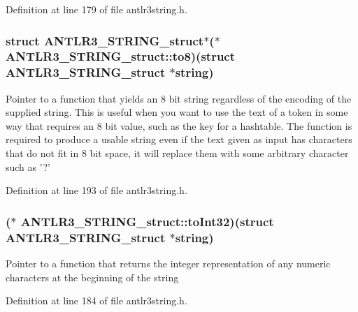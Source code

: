 Definition at line 179 of file antlr3string.\-h.

\hypertarget{struct_a_n_t_l_r3___s_t_r_i_n_g__struct_aec4caa47ade2654087cfab84e752f4b4}{
\subsubsection[{to8}]{\setlength{\rightskip}{0pt plus 5cm}struct {\bf A\-N\-T\-L\-R3\-\_\-\-S\-T\-R\-I\-N\-G\-\_\-struct}$\ast$($\ast$ A\-N\-T\-L\-R3\-\_\-\-S\-T\-R\-I\-N\-G\-\_\-struct\-::to8)(struct {\bf A\-N\-T\-L\-R3\-\_\-\-S\-T\-R\-I\-N\-G\-\_\-struct} $\ast$string)}}\label{struct_a_n_t_l_r3___s_t_r_i_n_g__struct_aec4caa47ade2654087cfab84e752f4b4}
Pointer to a function that yields an 8 bit string regardless of the encoding of the supplied string. This is useful when you want to use the text of a token in some way that requires an 8 bit value, such as the key for a hashtable. The function is required to produce a usable string even if the text given as input has characters that do not fit in 8 bit space, it will replace them with some arbitrary character such as '?' 

Definition at line 193 of file antlr3string.\-h.

\hypertarget{struct_a_n_t_l_r3___s_t_r_i_n_g__struct_a9aa39586e4398f80741d15fb2792c8f2}{
\subsubsection[{to\-Int32}]{($\ast$ A\-N\-T\-L\-R3\-\_\-\-S\-T\-R\-I\-N\-G\-\_\-struct\-::to\-Int32)(struct {\bf A\-N\-T\-L\-R3\-\_\-\-S\-T\-R\-I\-N\-G\-\_\-struct} $\ast$string)}}\label{struct_a_n_t_l_r3___s_t_r_i_n_g__struct_a9aa39586e4398f80741d15fb2792c8f2}
Pointer to a function that returns the integer representation of any numeric characters at the beginning of the string 

Definition at line 184 of file antlr3string.\-h.

